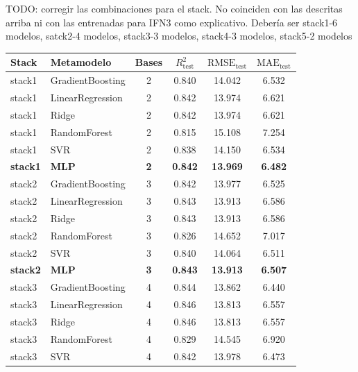 TODO: corregir las combinaciones para el stack. No coinciden con las descritas arriba ni con las entrenadas para IFN3 como explicativo. Debería ser stack1-6 modelos, satck2-4 modelos, stack3-3 modelos, stack4-3 modelos, stack5-2 modelos
\begin{table}
    \centering
    \small
    \footnotesize
    \begin{tabular}{llcccc}
        \hline
        \textbf{Stack}  & \textbf{Metamodelo}    & \textbf{Bases} & $R^2_{\text{test}}$ & $\text{RMSE}_{\text{test}}$  & $\text{MAE}_{\text{test}}$  \\
        \hline
        stack1 & GradientBoosting & 2 & 0.840 & 14.042 & 6.532 \\
        stack1 & LinearRegression & 2 & 0.842 & 13.974 & 6.621 \\
        stack1 & Ridge            & 2 & 0.842 & 13.974 & 6.621 \\
        stack1 & RandomForest     & 2 & 0.815 & 15.108 & 7.254 \\
        stack1 & SVR              & 2 & 0.838 & 14.150 & 6.534 \\
        \textbf{stack1} & \textbf{MLP}              & \textbf{2} & \textbf{0.842} & \textbf{13.969} & \textbf{6.482} \\
        \hline
        stack2 & GradientBoosting & 3 & 0.842 & 13.977 & 6.525 \\
        stack2 & LinearRegression & 3 & 0.843 & 13.913 & 6.586 \\
        stack2 & Ridge            & 3 & 0.843 & 13.913 & 6.586 \\
        stack2 & RandomForest     & 3 & 0.826 & 14.652 & 7.017 \\
        stack2 & SVR              & 3 & 0.840 & 14.064 & 6.511 \\
        \textbf{stack2} & \textbf{MLP}              & \textbf{3} & \textbf{0.843} & \textbf{13.913} & \textbf{6.507} \\
        \hline
        stack3 & GradientBoosting & 4 & 0.844 & 13.862 & 6.440 \\
        stack3 & LinearRegression & 4 & 0.846 & 13.813 & 6.557 \\
        stack3 & Ridge            & 4 & 0.846 & 13.813 & 6.557 \\
        stack3 & RandomForest     & 4 & 0.829 & 14.545 & 6.920 \\
        stack3 & SVR              & 4 & 0.842 & 13.978 & 6.473 \\

\end{tabular}
\end{table}
